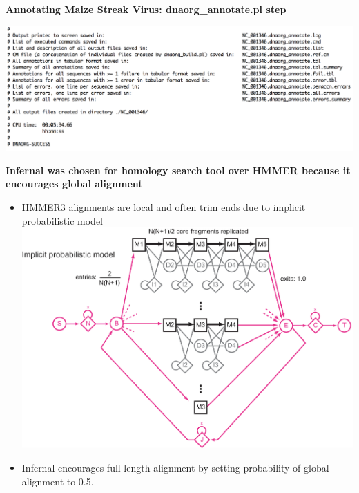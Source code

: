 \documentclass[landscape]{slides}
\begin{document}
\begin{slide}
\begin{center}
\textbf{Annotating Maize Streak Virus: dnaorg\_annotate.pl step} 

\includegraphics[width=10.5in]{figs/dnaorg-annotate-output2}

\end{center}
\vfill
\end{slide}
\begin{slide}
\begin{center}
\textbf{Infernal was chosen for homology search tool over HMMER 
  because it encourages global alignment}

\begin{itemize}
\item HMMER3 alignments are local and often trim ends due to implicit
  probabilistic model
\includegraphics[width=6in]{figs/hmmer-local-alignment}

\item Infernal encourages full length alignment by setting probability of
  global alignment to 0.5. 
\end{itemize}

\vfill
\end{center}
\end{slide}
\end{document}
